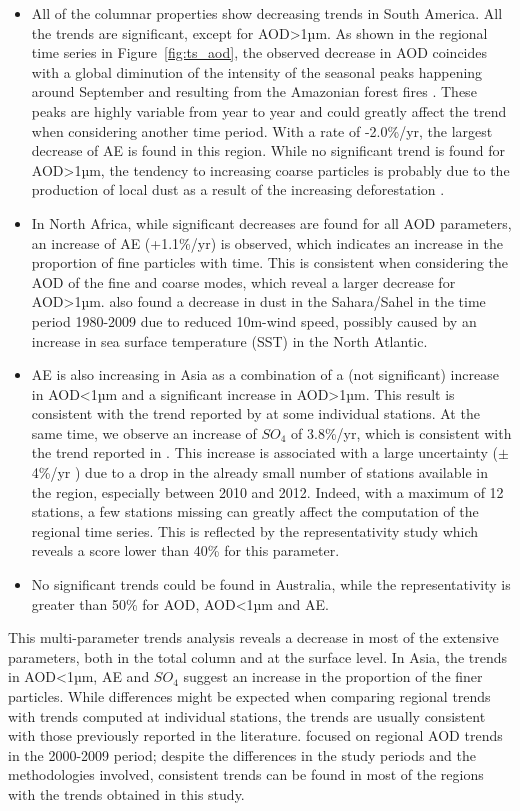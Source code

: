 \documentclass[journal abbreviation, manuscript]{copernicus}
\begin{document}
\begin{itemize}
 \item All of the columnar properties show decreasing trends in South America. All the trends are significant, except for AOD>1µm. As shown in the regional time series in Figure~\ref{fig:ts_aod}, the observed decrease in AOD coincides with a global diminution of the intensity of the seasonal peaks happening around September and resulting from the Amazonian forest fires \citep{aragao201821st}. These peaks are highly variable from year to year and could greatly affect the trend when considering another time period. With a rate of -2.0\%/yr, the largest decrease of AE is found in this region. While no significant trend is found for AOD>1µm, the tendency to increasing coarse particles is probably due to the production of local dust as a result of the increasing deforestation \citep{werth2002local,betts2008effects}.
 \item In North Africa, while significant decreases are found for all AOD parameters, an increase of AE (+1.1\%/yr) is observed, which indicates an increase in the proportion of fine particles with time. This is consistent when considering the AOD of the fine and coarse modes, which reveal a larger decrease for AOD>1µm. \cite{chin2014multi} also found a decrease in dust in the Sahara/Sahel in the time period 1980-2009 due to reduced 10m-wind speed, possibly caused by an increase in sea surface temperature (SST) in the North Atlantic.
 \item AE is also increasing in Asia as a combination of a (not significant) increase in AOD<1µm and a significant increase in AOD>1µm. This result is consistent with the trend reported by \cite{yoon2012trend} at some individual stations. At the same time, we observe an increase of $SO_{4}$ of 3.8\%/yr, which is consistent with the trend reported in \cite{aas2019global}. This increase is associated with a large uncertainty ($\pm$4\%/yr ) due to a drop in the already small number of stations available in the region, especially between 2010 and 2012. Indeed, with a maximum of 12 stations, a few stations missing can greatly affect the computation of the regional time series. This is reflected by the representativity study which reveals a score lower than 40\% for this parameter. 
 \item No significant trends could be found in Australia, while the representativity is greater than 50\% for AOD, AOD<1µm and AE.

\end{itemize}

This multi-parameter trends analysis reveals a decrease in most of the extensive parameters, both in the total column and at the surface level. In Asia, the trends in AOD<1µm, AE and $SO_{4}$ suggest an increase in the proportion of the finer particles. While differences might be expected when comparing regional trends with trends computed at individual stations, the trends are usually consistent with those previously reported in the literature.  \cite{DEMEIJ201275} focused on regional AOD trends in the 2000-2009 period; despite the differences in the study periods and the methodologies involved, consistent trends can be found in most of the regions with the trends obtained in this study.
\end{document}
